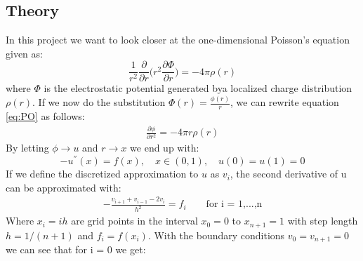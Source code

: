 \documentclass[12pt,a4paper]{article}
\newcommand{\Tom}[1]{\Big( #1 \Big)}
\begin{document}
\subsection*{Theory}
In this project we want to look closer at the one-dimensional Poisson's equation given as:
\begin{equation}
\frac{1}{r^2} \frac{\partial}{\partial r} \Tom{r^2 \frac{\partial \Phi}{\partial r}} = - 4 \pi \rho(r)
\label{eq:PO}
\end{equation}
where $\Phi$ is the electrostatic potential generated bya localized charge distribution $\rho(r)$. If we now do the substitution $\Phi(r) = \frac{\phi(r)}{r}$, we can rewrite equation \eqref{eq:PO} as follows:
\begin{align*}
\frac{\partial \phi}{\partial r^2} = - 4 \pi r \rho(r)
\end{align*}
By letting $\phi \rightarrow u$ and $r \rightarrow x$ we end up with:
\begin{equation}
-u^{''}(x) = f(x), \quad x \in (0,1), \quad u(0) = u(1) = 0
\label{eq:po}
\end{equation}
If we define the discretized approximation to $u$ as $v_i$, the second derivative of u can be approximated with:
\begin{align*}
- \frac{v_{i + 1} + v_{i-1} - 2v_i}{h^2} = f_i \qquad \text{for i = 1,...,n}
\end{align*}
Where $x_i = ih$ are grid points in the interval $x_0 = 0$ to $x_{n+1} = 1$ with step length $h = 1/(n+1)$ and $f_i = f(x_i)$. With the boundary conditions $v_0 = v_{n + 1} = 0$ we can see that for i = 0 we get:
\end{document}
